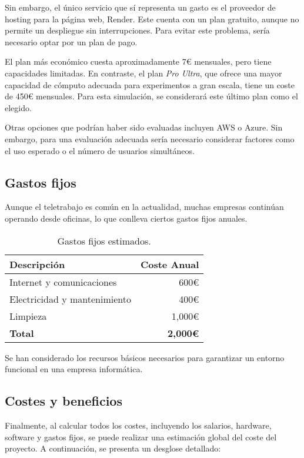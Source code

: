 Sin embargo, el único servicio que sí representa un gasto es el proveedor de hosting para la página web, Render. Este cuenta con un plan gratuito, aunque no permite un despliegue sin interrupciones. Para evitar este problema, sería necesario optar por un plan de pago. 

El plan más económico cuesta aproximadamente 7€ mensuales, pero tiene capacidades limitadas. En contraste, el plan \textit{Pro Ultra}, que ofrece una mayor capacidad de cómputo adecuada para experimentos a gran escala, tiene un coste de 450€ mensuales. Para esta simulación, se considerará este último plan como el elegido.

Otras opciones que podrían haber sido evaluadas incluyen AWS o Azure. Sin embargo, para una evaluación adecuada sería necesario considerar factores como el uso esperado o el número de usuarios simultáneos.

\subsection{Gastos fijos}

Aunque el teletrabajo es común en la actualidad, muchas empresas continúan operando desde oficinas, lo que conlleva ciertos gastos fijos anuales.

\begin{table}[H]
\centering
\begin{tabular}{lr}
\toprule
Descripción & Coste Anual \\ 
\midrule
Internet y comunicaciones & 600€ \\
Electricidad y mantenimiento & 400€ \\
Limpieza & 1,000€ \\
\textbf{Total} & \textbf{2,000€} \\ 
\bottomrule
\end{tabular}
\caption{Gastos fijos estimados.}
\end{table}

Se han considerado los recursos básicos necesarios para garantizar un entorno funcional en una empresa informática.

\subsection{Costes y beneficios}

Finalmente, al calcular todos los costes, incluyendo los salarios, hardware, software y gastos fijos, se puede realizar una estimación global del coste del proyecto. A continuación, se presenta un desglose detallado:

